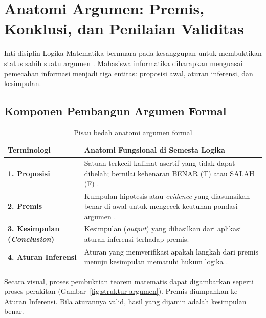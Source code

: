\section{Anatomi Argumen: Premis, Konklusi, dan Penilaian Validitas}

Inti disiplin Logika Matematika bermuara pada kesanggupan untuk membuktikan status sahih suatu argumen \cite{forallx,copi2014}. Mahasiswa informatika diharapkan menguasai pemecahan informasi menjadi tiga entitas: proposisi awal, aturan inferensi, dan kesimpulan.

\subsection{Komponen Pembangun Argumen Formal}

\begin{table}[htbp]
\centering
\small
\begin{tabular}{|>{\raggedright\arraybackslash}p{2.8cm}|>{\raggedright\arraybackslash}p{9.4cm}|}
\hline
\textbf{Terminologi} & \textbf{Anatomi Fungsional di Semesta Logika} \\
\hline
\textbf{1. Proposisi} & Satuan terkecil kalimat asertif yang tidak dapat dibelah; bernilai kebenaran BENAR (T) atau SALAH (F) \cite{rosen2019}. \\
\hline
\textbf{2. Premis} & Kumpulan hipotesis atau \textit{evidence} yang diasumsikan benar di awal untuk mengecek keutuhan pondasi argumen \cite{copi2014}. \\
\hline
\textbf{3. Kesimpulan (\textit{Conclusion})} & Kesimpulan (\textit{output}) yang dihasilkan dari aplikasi aturan inferensi terhadap premis. \\
\hline
\textbf{4. Aturan Inferensi} & Aturan yang memverifikasi apakah langkah dari premis menuju kesimpulan mematuhi hukum logika \cite{iep_natded}. \\
\hline
\end{tabular}
\caption{Pisau bedah anatomi argumen formal}
\label{tab:konsep-logika}
\end{table}

Secara visual, proses pembuktian teorem matematis dapat digambarkan seperti proses perakitan (Gambar~\ref{fig:struktur-argumen}). Premis diumpankan ke Aturan Inferensi. Bila aturannya valid, hasil yang dijamin adalah kesimpulan benar.


